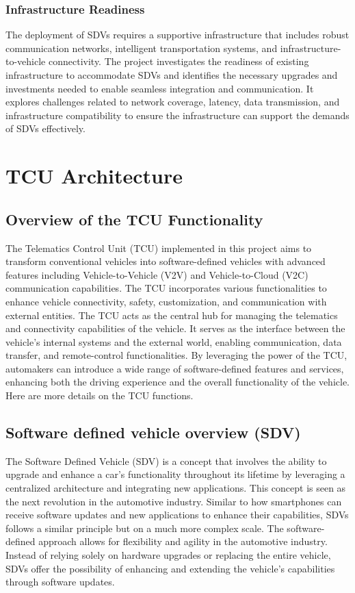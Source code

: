 \documentclass[
12pt,
oneside, 
onehalfspacing, 
nolistspacing, 
parskip, 
chapterinoneline, 
]{AASTCOMPUTER}
\begin{document}
\subsection{Infrastructure Readiness}
The deployment of SDVs requires a supportive infrastructure that includes robust communication networks, intelligent transportation systems, and infrastructure-to-vehicle connectivity. The project investigates the readiness of existing infrastructure to accommodate SDVs and identifies the necessary upgrades and investments needed to enable seamless integration and communication. It explores challenges related to network coverage, latency, data transmission, and infrastructure compatibility to ensure the infrastructure can support the demands of SDVs effectively.

\chapter{TCU Architecture}
\section{Overview of the TCU Functionality}
The Telematics Control Unit (TCU) implemented in this project aims to transform conventional vehicles into software-defined vehicles with advanced features including Vehicle-to-Vehicle (V2V) and Vehicle-to-Cloud (V2C) communication capabilities. The TCU incorporates various functionalities to enhance vehicle connectivity, safety, customization, and communication with external entities.
The TCU acts as the central hub for managing the telematics and connectivity capabilities of the vehicle. It serves as the interface between the vehicle's internal systems and the external world, enabling communication, data transfer, and remote-control functionalities. By leveraging the power of the TCU, automakers can introduce a wide range of software-defined features and services, enhancing both the driving experience and the overall functionality of the vehicle. Here are more details on the TCU functions.

\section{Software defined vehicle overview (SDV)}
The Software Defined Vehicle (SDV) is a concept that involves the ability to upgrade and enhance a car's functionality throughout its lifetime by leveraging a centralized architecture and integrating new applications. This concept is seen as the next revolution in the automotive industry. Similar to how smartphones can receive software updates and new applications to enhance their capabilities, SDVs follows a similar principle but on a much more complex scale. The software-defined approach allows for flexibility and agility in the automotive industry. Instead of relying solely on hardware upgrades or replacing the entire vehicle, SDVs offer the possibility of enhancing and extending the vehicle's capabilities through software updates. 
\end{document}
